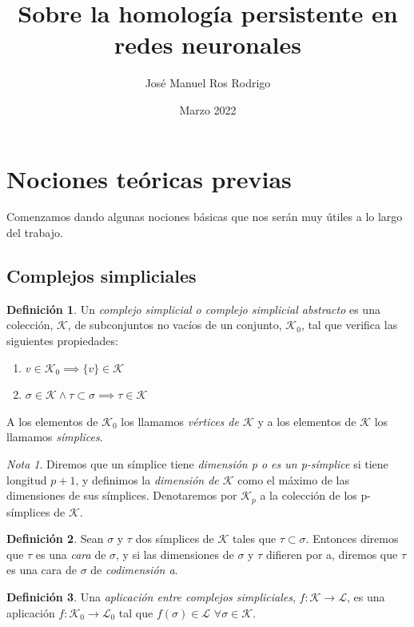 \documentclass[12pt]{article}
\title{Sobre la homología persistente en redes neuronales}
\author{José Manuel Ros Rodrigo}
\affil{Facultad de Ciencia y Tecnología\\
  Universidad de La Rioja}
\date{Marzo 2022}
\numberwithin{equation}{section}
\theoremstyle{definition}
\newtheorem{defi}{Definición}
\theoremstyle{remark}
\newtheorem*{remark}{Nota}
\theoremstyle{plain}
\begin{document}
	
	\maketitle

	\section{Nociones teóricas previas}
	
		Comenzamos dando algunas nociones básicas que nos serán muy útiles a lo largo del trabajo.
	
	\subsection{Complejos simpliciales}
		
		\begin{defi}
			Un \textit{complejo simplicial o complejo simplicial abstracto} es una colección, $\mathcal{K}$, de subconjuntos no vacíos de un conjunto, $\mathcal{K}_{0}$, 
			tal que verifica las siguientes propiedades:
			\begin{enumerate}
				\item $v \in \mathcal{K}_{0} \implies \{v\} \in \mathcal{K}$
				\item $ \sigma \in \mathcal{K} \land \tau \subset \sigma \implies \tau \in \mathcal{K}$	
			\end{enumerate}
			A los elementos de  $\mathcal{K}_{0}$ los llamamos \textit{vértices de $\mathcal{K}$} y a los elementos de $\mathcal{K}$ los llamamos \textit{símplices}. 
		\end{defi}

		\begin{remark}
			Diremos que un símplice tiene \textit{dimensión p o es un p-símplice} si tiene longitud $p+1$, y definimos la \textit{dimensión de $\mathcal{K}$} como el máximo
			de las dimensiones de sus símplices. Denotaremos por $\mathcal{K}_{p}$ a la colección de los p-símplices de $\mathcal{K}$.
		\end{remark}
			
		\begin{defi}
			Sean $\sigma$ y $\tau$ dos símplices de $\mathcal{K}$ tales que $\tau \subset \sigma$. Entonces diremos que $\tau$ es una \textit{cara} de $\sigma$, y
			si las dimensiones de $\sigma$ y $\tau$ difieren por a, diremos que $\tau$ es una cara de $\sigma$ de \textit{codimensión a}.
		\end{defi}

		\begin{defi}
			Una \textit{aplicación entre complejos simpliciales}, $f:\mathcal{K} \rightarrow \mathcal{L}$, es una aplicación $f:\mathcal{K}_{0} \rightarrow \mathcal{L}_{0}$ tal
			que $f(\sigma) \in \mathcal{L} \hspace{4pt} \forall \sigma \in \mathcal{K}$.
		\end{defi}
		
\end{document}
